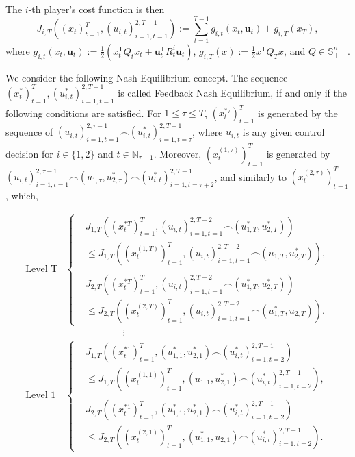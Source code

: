 \documentclass[letterpaper, 10 pt, conference]{ieeeconf}  %
\newcommand{\transpose}{\mathsf{T}}
\begin{document}
The $i$-th player's cost function is then
\begin{equation}\label{eq:LQcost}
    J_{i,T}((x_{t})_{t=1}^{T},(u_{i,t})_{i=1,t=1}^{2,T-1}) := \sum_{t=1}^{T-1} g_{i,t}(x_{t}, \mathbf{u}_{t}) + g_{i,T}(x_{T}),
\end{equation}
where $g_{i,t}(x_{t}, \mathbf{u}_{t}) := \frac{1}{2}(x_{t}^{\mathsf{T}}Q_{t}x_{t} + 
    \mathbf{u}_{t}^{\transpose}R_{t}^{i}\mathbf{u}_{t})$,
    $g_{i,T}(x) := \frac{1}{2} x^{\mathsf{T}}Q_{T}x$, and $Q\in\mathbb{S}_{++}^n$.

We consider the following Nash Equilibrium concept.
The sequence $(x_{t}^{*})_{t=1}^{T},(u_{i,t}^{*})_{i=1,t=1}^{2,T-1}$ is called Feedback Nash Equilibrium, if and only if the following conditions are satisfied. For $1 \leq \tau \leq T$, $(x_{t}^{*\tau})_{t=1}^{T}$ is generated by the sequence of $(u_{i,t})_{i=1,t=1}^{2,\tau-1} \frown (u_{i,t}^{*})_{i=1,t=\tau}^{2,T-1}$, where $u_{i,t}$ is any given control decision for $i \in \{ 1,2\}$ and $t \in \mathbb{N}_{\tau-1}$. Moreover, $(x_{t}^{(1,\tau)})_{t=1}^{T}$ is generated by $(u_{i,t})_{i=1,t=1}^{2,\tau-1} \frown (u_{1,\tau},u_{2,\tau}^{*}) \frown (u_{i,t}^{*})_{i=1,t=\tau+2}^{2,T-1}$, and similarly to $(x_{t}^{(2,\tau)})_{t=1}^{T}$, which,

\begin{equation}\label{eq:nashIneq}
    \begin{split}
        \text{Level T}
        &\begin{cases}
            &J_{1,T}((x_{t}^{*T})_{t=1}^{T}, (u_{i,t})_{i=1,t=1}^{2,T-2} \frown (u_{1,T}^{*},u_{2,T}^{*})) \\ & \leq J_{1,T}((x_{t}^{(1,T)})_{t=1}^{T}, (u_{i,t})_{i=1,t=1}^{2,T-2} \frown (u_{1,T},u_{2,T}^{*})),\\ \\
            &J_{2,T}((x_{t}^{*T})_{t=1}^{T}, (u_{i,t})_{i=1,t=1}^{2,T-2} \frown (u_{1,T}^{*},u_{2,T}^{*})) \\ & \leq J_{2,T}((x_{t}^{(2,T)})_{t=1}^{T}, (u_{i,t})_{i=1,t=1}^{2,T-2} \frown (u_{1,T}^{*},u_{2,T})).
        \end{cases}
    \\ &\qquad \qquad \qquad \vdots \\
    \text{Level 1}
        &\begin{cases}
            &J_{1,T}((x_{t}^{*1})_{t=1}^{T}, (u_{1,1}^{*},u_{2,1}^{*}) \frown (u_{i,t}^{*})_{i=1,t=2}^{2,T-1}) \\ & \leq J_{1,T}((x_{t}^{(1,1)})_{t=1}^{T}, (u_{1,1},u_{2,1}^{*}) \frown (u_{i,t}^{*})_{i=1,t=2}^{2,T-1}),\\ \\
            &J_{2,T}((x_{t}^{*1})_{t=1}^{T}, (u_{1,1}^{*},u_{2,1}^{*}) \frown (u_{i,t}^{*})_{i=1,t=2}^{2,T-1}) \\ & \leq J_{2,T}((x_{t}^{(2,1)})_{t=1}^{T}, (u_{1,1}^{*},u_{2,1}) \frown (u_{i,t}^{*})_{i=1,t=2}^{2,T-1}).
        \end{cases}
    \end{split}
\end{equation}
\end{document}

